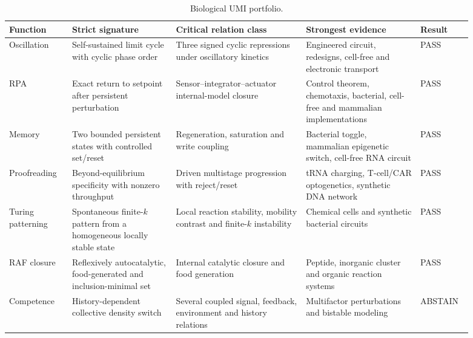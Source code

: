 \begin{table}[p]
\centering
\scriptsize
\caption{Biological UMI portfolio.}
\label{tab:bio-portfolio}
\begin{tabular}{p{0.12\linewidth}p{0.20\linewidth}p{0.25\linewidth}p{0.22\linewidth}p{0.10\linewidth}}
\toprule
Function & Strict signature & Critical relation class & Strongest evidence & Result \\
\midrule
Oscillation & Self-sustained limit cycle with cyclic phase order & Three signed cyclic repressions under oscillatory kinetics & Engineered circuit, redesigns, cell-free and electronic transport & PASS \\
RPA & Exact return to setpoint after persistent perturbation & Sensor--integrator--actuator internal-model closure & Control theorem, chemotaxis, bacterial, cell-free and mammalian implementations & PASS \\
Memory & Two bounded persistent states with controlled set/reset & Regeneration, saturation and write coupling & Bacterial toggle, mammalian epigenetic switch, cell-free RNA circuit & PASS \\
Proofreading & Beyond-equilibrium specificity with nonzero throughput & Driven multistage progression with reject/reset & tRNA charging, T-cell/CAR optogenetics, synthetic DNA network & PASS \\
Turing patterning & Spontaneous finite-$k$ pattern from a homogeneous locally stable state & Local reaction stability, mobility contrast and finite-$k$ instability & Chemical cells and synthetic bacterial circuits & PASS \\
RAF closure & Reflexively autocatalytic, food-generated and inclusion-minimal set & Internal catalytic closure and food generation & Peptide, inorganic cluster and organic reaction systems & PASS \\
Competence & History-dependent collective density switch & Several coupled signal, feedback, environment and history relations & Multifactor perturbations and bistable modeling & ABSTAIN \\
\bottomrule
\end{tabular}
\end{table}

